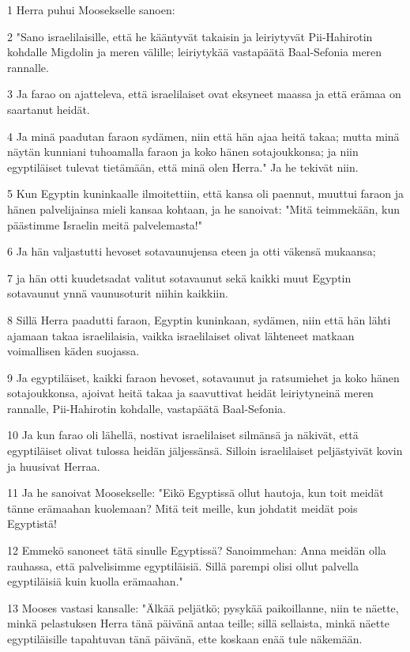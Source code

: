 \par 1 Herra puhui Moosekselle sanoen:
\par 2 "Sano israelilaisille, että he kääntyvät takaisin ja leiriytyvät Pii-Hahirotin kohdalle Migdolin ja meren välille; leiriytykää vastapäätä Baal-Sefonia meren rannalle.
\par 3 Ja farao on ajatteleva, että israelilaiset ovat eksyneet maassa ja että erämaa on saartanut heidät.
\par 4 Ja minä paadutan faraon sydämen, niin että hän ajaa heitä takaa; mutta minä näytän kunniani tuhoamalla faraon ja koko hänen sotajoukkonsa; ja niin egyptiläiset tulevat tietämään, että minä olen Herra." Ja he tekivät niin.
\par 5 Kun Egyptin kuninkaalle ilmoitettiin, että kansa oli paennut, muuttui faraon ja hänen palvelijainsa mieli kansaa kohtaan, ja he sanoivat: "Mitä teimmekään, kun päästimme Israelin meitä palvelemasta!"
\par 6 Ja hän valjastutti hevoset sotavaunujensa eteen ja otti väkensä mukaansa;
\par 7 ja hän otti kuudetsadat valitut sotavaunut sekä kaikki muut Egyptin sotavaunut ynnä vaunusoturit niihin kaikkiin.
\par 8 Sillä Herra paadutti faraon, Egyptin kuninkaan, sydämen, niin että hän lähti ajamaan takaa israelilaisia, vaikka israelilaiset olivat lähteneet matkaan voimallisen käden suojassa.
\par 9 Ja egyptiläiset, kaikki faraon hevoset, sotavaunut ja ratsumiehet ja koko hänen sotajoukkonsa, ajoivat heitä takaa ja saavuttivat heidät leiriytyneinä meren rannalle, Pii-Hahirotin kohdalle, vastapäätä Baal-Sefonia.
\par 10 Ja kun farao oli lähellä, nostivat israelilaiset silmänsä ja näkivät, että egyptiläiset olivat tulossa heidän jäljessänsä. Silloin israelilaiset peljästyivät kovin ja huusivat Herraa.
\par 11 Ja he sanoivat Moosekselle: "Eikö Egyptissä ollut hautoja, kun toit meidät tänne erämaahan kuolemaan? Mitä teit meille, kun johdatit meidät pois Egyptistä!
\par 12 Emmekö sanoneet tätä sinulle Egyptissä? Sanoimmehan: Anna meidän olla rauhassa, että palvelisimme egyptiläisiä. Sillä parempi olisi ollut palvella egyptiläisiä kuin kuolla erämaahan."
\par 13 Mooses vastasi kansalle: "Älkää peljätkö; pysykää paikoillanne, niin te näette, minkä pelastuksen Herra tänä päivänä antaa teille; sillä sellaista, minkä näette egyptiläisille tapahtuvan tänä päivänä, ette koskaan enää tule näkemään.
